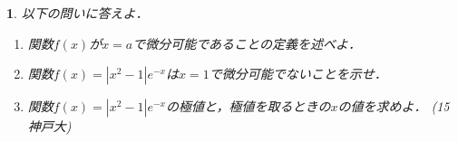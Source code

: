 \documentclass[10pt,
b5paper,
fleqn,
dvipdfmx,
uplatex
]{jsarticle}
\newtheorem{question}[Question]{}
\newcommand{\bqu}{\begin{mybox}\begin{question}}
\newcommand{\equ}{\end{question}\end{mybox}}
\newcommand{\benu}{\begin{enumerate}}
\newcommand{\eenu}{\end{enumerate}}
\newcommand{\bb}{\bf\boldmath}%
\newenvironment{leftbbar}{%
\def\FrameCommand{\color{mygray} \vrule width 5pt \hspace{1zw}
\color{black}}%
\MakeFramed {\advance\hsize-\width \FrameRestore}}%
{\endMakeFramed}
\newenvironment{解答}{
\hspace{-2zw}\phkasen<linethickness=7pt,iro=mygray,kasenUehosei=-3pt>{\bf \large \ 解答\ }\vspace{-1zw}\begin{leftbbar}}{\end{leftbbar}}
\newif\ifkaisetu
\begin{document}
{\ifkaisetu
\begin{解答}\vspace{-2.5zw}
\benu
\item $f(x)=(x-1)e^x$とおくと，$f'(x)=e^x+(x-1)e^x=xe^x$．よって，接線の方程式は
\begin{align*}
y&=te^t(x-t)+(t-1)e^t\\
y&=te^t x+(-t^2+t-1)e^t
\end{align*}
これと$y=\bunsuu 1{2e}x^2+a$から$y$を消去すると，
\begin{align*}
&\bunsuu 1{2e}x^2+a=te^t x+(-t^2+t-1)e^t\\
&\bunsuu 1{2e}x^2-te^t x+(t^2-t+1)e^t+a=0
\end{align*}
これが重解をもつので，
\begin{align*}
(-te^t)^2-4\cdot \bunsuu 1{2e} \cdot ((t^2-t+1)e^t+a) &=0\\
\text{\bb $\bunsuu e2 \left\{t^2e^{2t}-2(t^2-t+1)e^{t-1}\right\}$}&=a
\end{align*}
\item (1)の結果より
\begin{align*}
a'&=\bunsuu e2 \left\{2t e^{2t}+2t^2e^{2t}-2(2t-1)e^{t-1}-2(t^2-t+1)e^{t-1}\right\}\\
&=\bunsuu e2 \left\{2(t^2+t) e^{2t}-2(t^2+t)e^{t-1}\right\}\\
&=\bunsuu e2 \cdot 2(t^2+t)e^{t-1}(e^{t+1}-1)\\
&= 2t(t+1) e^t(e^{t+1}-1)1
\end{align*}
よって，$a$の増減は次のようになる．
\[\begin{array}{c|cccccccc}
\phantom{\bunsuu 11} x	&\cdots	&-1	&\cdots	 	&0	&\cdots	\\\hline
\phantom{\bunsuu 11}f'(x)	&-		&0	&-			&0	&+		\\\hline
\phantom{\bunsuu 11}f(x)	&\SE	&	&\SE		&	&\NE		
\end{array}
\]
よって，{\bb $t=0$で極小値$-1$をとる}．
\eenu
\end{解答}
\newpage
\fi

\bqu 以下の問いに答えよ．
\benu
\item 関数$f(x)$が$x=a$で微分可能であることの定義を述べよ．
\item 関数$f(x)=|x^2-1| e^{-x}$は$x=1$で微分可能でないことを示せ．
\item 関数$f(x)=|x^2-1| e^{-x}$の極値と，極値を取るときの$x$の値を求めよ．
\hfill(15 神戸大)
\eenu
\equ

}
\end{document}
